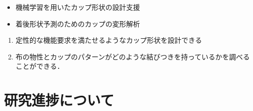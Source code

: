 \documentclass[11pt]{jsarticle}
\begin{document}
	\articleSPRabst
		\begin{itemize}
			\item 機械学習を用いたカップ形状の設計支援
			\item 着後形状予測のためのカップの変形解析
		\end{itemize}
		
		
	\articleSPRobj
		\begin{enumerate}
			\item 定性的な機能要求を満たせるようなカップ形状を設計できる
			\item 布の物性とカップのパターンがどのような結びつきを持っているかを調べることができる．
		\end{enumerate}
	\articleSPRitemsone
		
		\tableofcontents
		
		
	\articleSPRitemstwo
	\renewcommand{\labelitemi}{$\blacktriangledown$}
	\newcommand{\argmax}{\mathop{\rm arg~max}\limits}
	\newcommand{\argmin}{\mathop{\rm arg~min}\limits}
	\newcommand{\Ker}{{\rm Ker}}
	\newcommand{\rank}{{\rm rank}}
	\section{研究進捗について}
\end{document}
